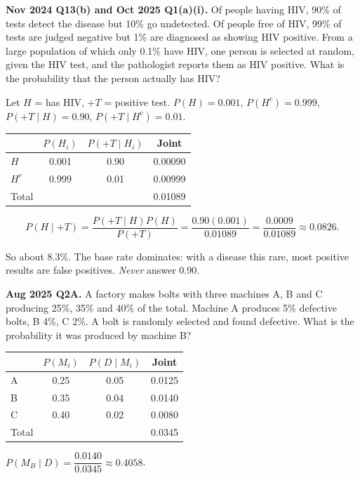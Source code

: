 \documentclass[11pt,a4paper]{article}
\begin{document}
\begin{pyqbox}
\textbf{Nov 2024 Q13(b) and Oct 2025 Q1(a)(i).} Of people having HIV, 90\% of tests detect the disease but 10\% go undetected. Of people free of HIV, 99\% of tests are judged negative but 1\% are diagnosed as showing HIV positive. From a large population of which only 0.1\% have HIV, one person is selected at random, given the HIV test, and the pathologist reports them as HIV positive. What is the probability that the person actually has HIV?
\end{pyqbox}

\begin{solbox}
Let $H$ = has HIV, $+T$ = positive test. $P(H)=0.001$, $P(H^c)=0.999$, $P(+T\mid H)=0.90$, $P(+T\mid H^c)=0.01$.

\begin{center}\small
\begin{tabular}{lccc}
\toprule & $P(H_i)$ & $P(+T\mid H_i)$ & Joint\\\midrule
$H$ & 0.001 & 0.90 & 0.00090\\
$H^c$ & 0.999 & 0.01 & 0.00999\\\midrule
Total & & & 0.01089\\\bottomrule
\end{tabular}
\end{center}

\[
P(H\mid +T)=\frac{P(+T\mid H)P(H)}{P(+T)}=\frac{0.90(0.001)}{0.01089}=\frac{0.0009}{0.01089}\approx\boxed{0.0826}.
\]

So about 8.3\%. The base rate dominates: with a disease this rare, most positive results are false positives. \emph{Never} answer $0.90$.
\end{solbox}

\begin{pyqbox}
\textbf{Aug 2025 Q2A.} A factory makes bolts with three machines A, B and C producing 25\%, 35\% and 40\% of the total. Machine A produces 5\% defective bolts, B 4\%, C 2\%. A bolt is randomly selected and found defective. What is the probability it was produced by machine B?
\end{pyqbox}

\begin{solbox}
\begin{center}\small
\begin{tabular}{lccc}
\toprule & $P(M_i)$ & $P(D\mid M_i)$ & Joint\\\midrule
A & 0.25 & 0.05 & 0.0125\\
B & 0.35 & 0.04 & 0.0140\\
C & 0.40 & 0.02 & 0.0080\\\midrule
Total & & & 0.0345\\\bottomrule
\end{tabular}
\end{center}

$P(M_B\mid D)=\dfrac{0.0140}{0.0345}\approx\boxed{0.4058}$.
\end{solbox}
\end{document}
